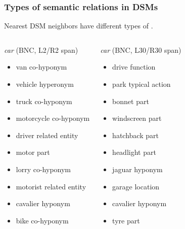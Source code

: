 \documentclass[t]{beamer} %
\begin{document}
\begin{frame}
  \frametitle{Types of semantic relations in DSMs}

  \ungap[.5]
  Nearest DSM neighbors have different types of .

  \ungap[.5]\footnotesize
  \begin{columns}[t]
    \column{5cm}
    \begin{block}{\emph{car} {\small (BNC, L2/R2 span)}}
      \begin{itemize}
      \item van {\color{counterpoint} co-hyponym}
      \item vehicle {\color{counterpoint} hyperonym}
      \item truck {\color{counterpoint} co-hyponym}
      \item motorcycle {\color{counterpoint} co-hyponym}
      \item driver {\color{counterpoint} related entity}
      \item motor {\color{counterpoint} part}
      \item lorry {\color{counterpoint} co-hyponym}
      \item motorist {\color{counterpoint} related entity}
      \item cavalier {\color{counterpoint} hyponym}
      \item bike {\color{counterpoint} co-hyponym}
      \end{itemize}
    \end{block}
    \column{5cm}
    \begin{block} {\emph{car} {\small (BNC, L30/R30 span)}}
      \begin{itemize}
      \item drive {\color{counterpoint} function}
      \item park {\color{counterpoint} typical action}
      \item bonnet {\color{counterpoint} part}
      \item windscreen {\color{counterpoint} part}
      \item hatchback {\color{counterpoint} part}
      \item headlight {\color{counterpoint} part}
      \item jaguar {\color{counterpoint} hyponym}
      \item garage {\color{counterpoint} location}
      \item cavalier {\color{counterpoint} hyponym}
      \item tyre {\color{counterpoint} part}
      \end{itemize}
    \end{block}
  \end{columns}

  \hfill{}
\end{frame}
\end{document}
